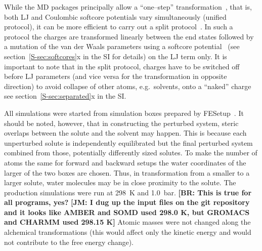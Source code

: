 \documentclass[journal=jctcce,manuscript=article]{achemso}
\begin{document}
While the MD packages principally allow a ``one--step''
transformation~\cite{steinbrecher_soft-core_2011},
that is, both LJ and Coulombic softcore potentials vary
simultaneously (unified protocol), it can be more efficient to carry out a
split protocol~\cite{Deng-2004, naden_linear_2014, naden_linear_2015}.
In such a protocol the charges are transformed
linearly between the end states followed by a mutation of the van der
Waals parameters using a softcore
potential~\cite{beutler_avoiding_1994,
  zacharias_separationshifted_1994} (see section~\ref{S-sec:softcores}x in the
SI for details) on the LJ term only.  It is important to note that in the split protocol, charges have to be switched off before LJ parameters (and vice versa
for the transformation in opposite direction) to avoid collapse of
other atoms, e.g.\ solvents, onto a ``naked''
charge\cite{pitera_comparison_2002, anwar_robust_2005,
steinbrecher_soft-core_2011} see section~\ref{S-sec:separated}x in the SI.

All simulations were started from simulation boxes prepared by
FESetup~\cite{loeffler_fesetup:_2015}.  It should be noted, however, that in
constructing the perturbed system, steric overlaps between the solute and the
solvent may happen.  This is because each unperturbed solute is independently
equilibrated but the final perturbed system combined from those, potentially
differently sized solutes.  To make the number of atoms the same for forward
and backward setups the water coordinates of the larger of the two boxes are
chosen.  Thus, in transformation from a smaller to a larger solute, water
molecules may be in close proximity to the solute.  The production simulations
were run at \SI{298}{K} and \SI{1.0}{bar}.
{\color{red} \footnotesize \bf [BR: This is true for all programs, yes?}
{\color{blue} \footnotesize \bf [JM: I dug up the input files on the git repository and it looks like AMBER and SOMD used 298.0 K, but  GROMACS and CHARMM used 298.15 K]}
Atomic masses were not changed along the alchemical transformations (this would affect only the kinetic energy and would not contribute to the free energy change). 


%
\end{document}
